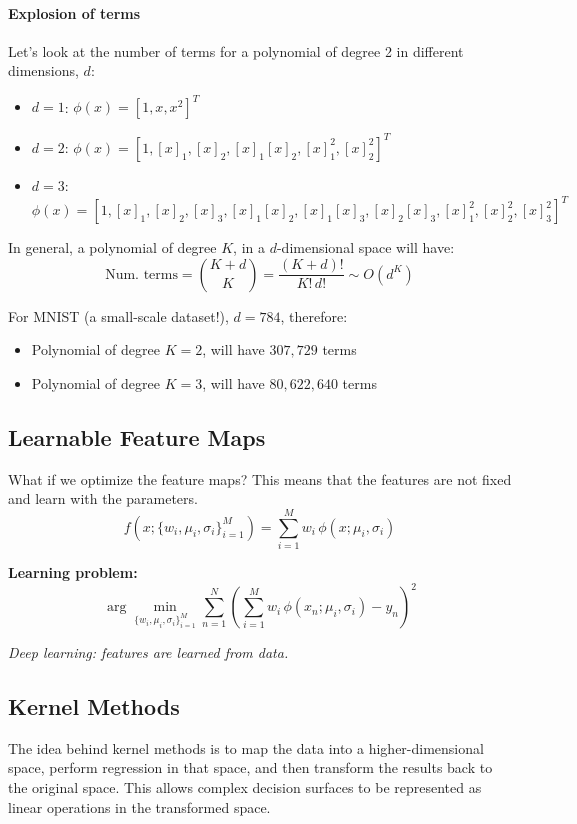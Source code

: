 \documentclass[11pt]{article}
\begin{document}
\paragraph{Explosion of terms}
Let’s look at the number of terms for a polynomial of degree 2 in different dimensions, $d$:
\begin{itemize}
	\item $d = 1$: \quad $\phi(x) = [1, x, x^2]^T$
	\item $d = 2$: \quad $\phi(x) = [1, [x]_1, [x]_2, [x]_1[x]_2, [x]_1^2, [x]_2^2]^T$
	\item $d = 3$: \quad $\phi(x) = [1, [x]_1, [x]_2, [x]_3, [x]_1[x]_2, [x]_1[x]_3, [x]_2[x]_3, [x]_1^2, [x]_2^2, [x]_3^2]^T$
\end{itemize}

\vspace{0.4cm}
In general, a polynomial of degree $K$, in a $d$-dimensional space will have:
\[
	\text{Num. terms} = \binom{K+d}{K} = \frac{(K+d)!}{K! \, d!} \sim O(d^K)
\]

\vspace{0.4cm}
For MNIST (a small-scale dataset!), $d = 784$, therefore:
\begin{itemize}
	\item Polynomial of degree $K=2$, will have $307{,}729$ terms
	\item Polynomial of degree $K=3$, will have $80{,}622{,}640$ terms
\end{itemize}


\subsection*{Learnable Feature Maps}

What if we optimize the feature maps?
This means that the features are not fixed and learn with the parameters.
\[
	f\!\left(x;\{w_i,\mu_i,\sigma_i\}_{i=1}^M\right)
	= \sum_{i=1}^{M} w_i\,\phi\!\left(x;\mu_i,\sigma_i\right)
\]

\vspace{0.75em}
\textbf{Learning problem:}
\[
	\arg\min_{\{w_i,\mu_i,\sigma_i\}_{i=1}^M}
	\sum_{n=1}^{N}\!\left(
	\sum_{i=1}^{M} w_i\,\phi\!\left(x_n;\mu_i,\sigma_i\right) - y_n
	\right)^{\!2}
\]

\vspace{0.75em}
\textit{Deep learning: features are learned from data.}

\subsection*{Kernel Methods}
The idea behind kernel methods is to map the data into a higher-dimensional space, perform regression in that space, and then transform the results back to the original space. This allows complex decision surfaces to be represented as linear operations in the transformed space.
\end{document}
